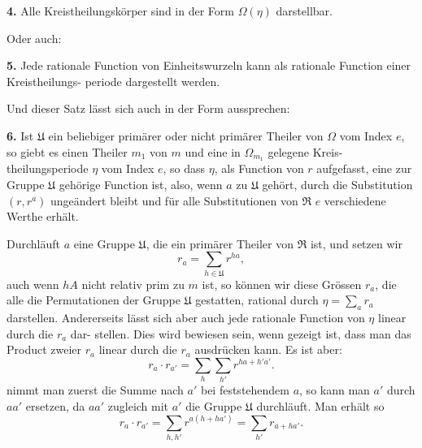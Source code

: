 \documentclass[12pt,a4paper]{article}
\theoremstyle{plain}
\theoremstyle{definition}
\theoremstyle{remark}
\begin{document}
\textbf{4.} Alle Kreistheilungskörper sind in der Form $\Omega(\eta)$
darstellbar.

Oder auch:

\textbf{5.} Jede rationale Function von Einheitswurzeln
kann als rationale Function einer Kreistheilungs-
periode dargestellt werden.

Und dieser Satz lässt sich auch in der Form aussprechen:

\textbf{6.} Ist $\mathfrak{U}$ ein beliebiger primärer oder nicht primärer
Theiler von $\Omega$ vom Index $e$, so giebt es einen
Theiler $m_1$ von $m$ und eine in $\Omega_{m_1}$ gelegene Kreis-
theilungsperiode $\eta$ vom Index $e$, so dass $\eta$, als
Function von $r$ aufgefasst, eine zur Gruppe $\mathfrak{U}$
gehörige Function ist, also, wenn $a$ zu $\mathfrak{U}$ gehört,
durch die Substitution $(r, r^a)$ ungeändert bleibt
und für alle Substitutionen von $\mathfrak{R}$ $e$ verschiedene
Werthe erhält.

Durchläuft $a$ eine Gruppe $\mathfrak{U}$, die ein primärer Theiler von
$\mathfrak{R}$ ist, und setzen wir
\[
r_a = \sum_{h \in \mathfrak{U}} r^{ha},
\]
auch wenn $hA$ nicht relativ prim zu $m$ ist, so können wir diese
Grössen $r_a$, die alle die Permutationen der Gruppe $\mathfrak{U}$ gestatten,
rational durch $\eta = \sum_a r_a$ darstellen. Andererseits lässt sich aber
auch jede rationale Function von $\eta$ linear durch die $r_a$ dar-
stellen. Dies wird bewiesen sein, wenn gezeigt ist, dass man
das Product zweier $r_a$ linear durch die $r_a$ ausdrücken kann. Es
ist aber:
\[
r_a \cdot r_{a'} = \sum_h \sum_{h'} r^{ha + h'a'}.
\]
nimmt man zuerst die Summe nach $a'$ bei feststehendem $a$, so
kann man $a'$ durch $aa'$ ersetzen, da $aa'$ zugleich mit $a'$ die
Gruppe $\mathfrak{U}$ durchläuft. Man erhält so
\[
r_a \cdot r_{a'} = \sum_{h,h'} r^{a(h+ha')} = \sum_{h'} r_{a+ha'}.
\]
\end{document}
